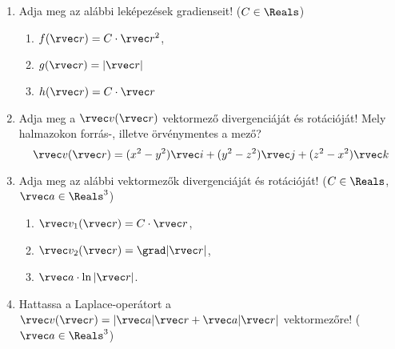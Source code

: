 \documentclass[a4paper, 12pt]{scrartcl}
\begin{document}
\begin{enumerate}
  \item Adja meg az alábbi leképezések gradienseit!
        ($C \in \Reals$)
        \begin{multicols}{3}
          \begin{enumerate}
            \item $f (\rvec r) = C \cdot \rvec r^2$,
            \item $g (\rvec r) = |\rvec r|$
            \item $h (\rvec r) = C \cdot \rvec r$
          \end{enumerate}
        \end{multicols}

  \item Adja meg a $\rvec v (\rvec r)$ vektormező divergenciáját és rotációját!
        Mely halmazokon forrás-, illetve örvénymentes a mező?
        $$
          \rvec v(\rvec r)
          = (x^2 - y^2) \rvec i
          + (y^2 - z^2) \rvec j
          + (z^2 - x^2) \rvec k
        $$

  \item Adja meg az alábbi vektormezők divergenciáját és rotációját!
        ($C \in \Reals$, $\rvec a \in \Reals^3$)
        \begin{multicols}{3}
          \begin{enumerate}
            \item $\rvec v_1(\rvec r) = C \cdot \rvec r$,
            \item $\rvec v_2(\rvec r) = \grad |\rvec r|$,
            \item $\rvec a \cdot \ln |\rvec r|$.
          \end{enumerate}
        \end{multicols}

  \item Hattassa a Laplace-operátort a $\rvec v (\rvec r) = |\rvec a| \rvec r +
          \rvec a |\rvec r|$ vektormezőre! ($\rvec a \in \Reals^3$)
\end{enumerate}
\end{document}
